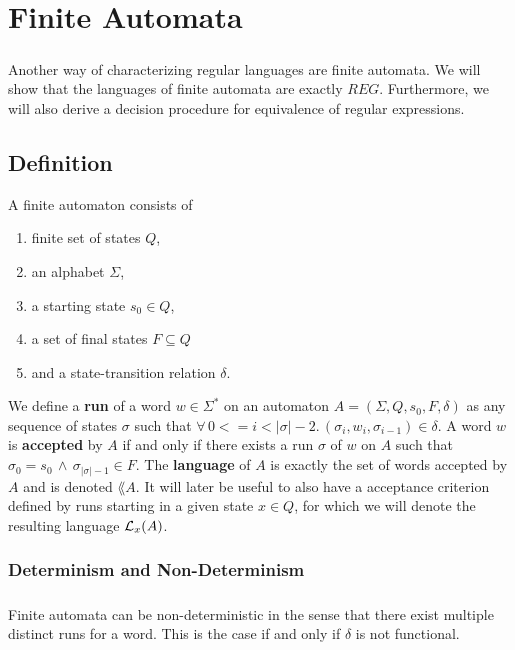 
\chapter{Finite Automata}
\paragraph{} 
Another way of characterizing regular languages are finite automata. 
We will show that the languages of finite automata are exactly $REG$. 
Furthermore, we will also derive a decision procedure for equivalence of regular expressions.

\section{Definition}
A finite automaton consists of
\begin{enumerate}
    \item
        finite set of states $Q$, 
    \item 
        an alphabet $\Sigma$, 
    \item 
        a starting state $s_0 \in Q$, 
    \item 
        a set of final states $F \subseteq Q$ 
    \item 
        and a state-transition relation $\delta$. \cite{DBLP:books/daglib/0011126}
\end{enumerate}

We define a \textbf{run} of a word $w \in \Sigma^*$ on an automaton $A = (\Sigma, Q, s_0, F, \delta)$ as any sequence of states $\sigma$ such that 
$\forall \, 0 <= i < \vert\sigma\vert-2. \, (\sigma_i, w_i, \sigma_{i-1}) \in \delta$.
A word $w$ is \textbf{accepted} by $A$ if and only if there exists a run $\sigma$ of $w$ on $A$ such that $\sigma_0 = s_0 \, \wedge \, \sigma_{\vert\sigma\vert-1} \in F$.
The \textbf{language} of $A$ is exactly the set of words accepted by $A$ and is denoted $\lang{A}$. 
It will later be useful to also have a acceptance criterion defined by runs starting in a given state $x \in Q$, for which we will denote the resulting language $\mathcal{L}_x(A)$.

\subsection{Determinism and Non-Determinism}


\paragraph{} 
Finite automata can be non-deterministic in the sense that there exist multiple distinct runs for a word. This is the case if and only if $\delta$ is not functional. 

